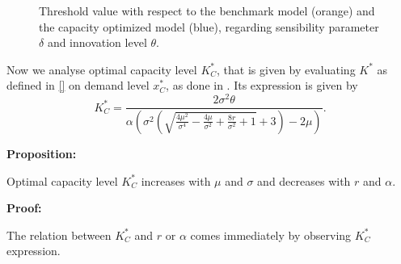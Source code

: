 \begin{figure}[!htb]
	\begin{subfigmatrix}{2}
	\end{subfigmatrix}
\caption{Threshold value with respect to the benchmark model (orange) and the capacity optimized model (blue), regarding sensibility parameter $\delta$ and innovation level $\theta$.}
\label{fig:td}
\end{figure}



Now we analyse optimal capacity level $K^*_C$, that is given by evaluating $K^*$ as defined in \eqref{} on demand level $x^*_C$, as done in \cite{huis:cap}. Its expression is given by
$$K^*_C=\frac{2 \sigma ^2 \theta}{\alpha \left(\sigma ^2 \left(\sqrt{\frac{4 \mu ^2}{\sigma ^4}-\frac{4 \mu }{\sigma ^2}+\frac{8 r}{\sigma ^2}+1}+3\right)-2 \mu \right)}.$$

\textbf{Proposition:}

Optimal capacity level $K^*_C$ increases with $\mu$ and $\sigma$ and decreases with $r$ and $\alpha$.

\textbf{Proof:}

The relation between $K^*_C$ and $r$ or $\alpha$ comes immediately by observing $K^*_C$ expression.

